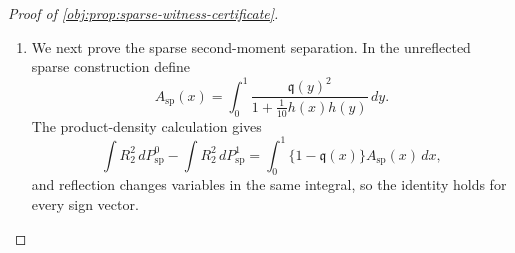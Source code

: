 \documentclass[11pt]{article}
\begin{document}
\begin{proof}[Proof of \cref{obj:prop:sparse-witness-certificate}]
\begin{enumerate}
For the cancellation law, put
\[
\bar\kappa=\int_0^1\kappa_1(x)\,dx,
\qquad
\overline{\kappa^2}=\int_0^1\kappa_1(x)^2\,dx.
\]
The function \(\kappa_1\) is continuous and nonconstant: indeed \(H(0)=H(1)=0\), while
\[
H(1/2)=\frac{\exp(2)-1}{\exp(4)-1}-\frac12
=\frac1{\exp(2)+1}-\frac12<0.
\]
Therefore
\[
0<\int_0^1\{\kappa_1(x)-\bar\kappa\}^2\,dx
=\overline{\kappa^2}-\bar\kappa^2.
\]
The cancellation child density is \(1+\frac1{10}\kappa_1(x)\chi_2(y)\), and the same centered-coordinate calculation gives
\[
\int \kappa_1(v_1)\,dP^0_{\mathrm{can}}(v)=\bar\kappa,
\qquad
\int \chi_2(v_2)\,dP^0_{\mathrm{can}}(v)=\frac1{30}\bar\kappa,
\]
\[
\int \kappa_1(v_1)\chi_2(v_2)\,dP^0_{\mathrm{can}}(v)=\frac1{30}\overline{\kappa^2}.
\]
Independence of the first two coordinates under \(P^0_{\mathrm{can}}\) would force
\[
\frac1{30}\overline{\kappa^2}
=
\bar\kappa\cdot\frac1{30}\bar\kappa,
\]
contradicting \(\overline{\kappa^2}-\bar\kappa^2>0\).  Hence the edge endpoints are also dependent in the cancellation observational law.  Finally, the factorization over \(1\to2\) with node \(3\) isolated gives the local-Markov independence of nodes \(1\) and \(3\).  In this three-node graph, any failed d-separation between disjoint coordinate blocks places the endpoints of the unique edge in opposite blocks; if the conditioning block contains node \(3\), contraction with the independence of nodes \(1\) and \(3\) reduces it to the unconditional edge independence just ruled out.  Both observational laws are therefore faithful to the three-node DAG, giving \cref{obj:ass:faithfulness}. %

\item We next prove the sparse second-moment separation.  In the unreflected sparse construction define
\[
A_{\mathrm{sp}}(x)
=
\int_0^1
\frac{\mathfrak q(y)^2}{1+\frac1{10}h(x)h(y)}\,dy .
\]
The product-density calculation gives
\[
\int R_2^2\,dP^0_{\mathrm{sp}}
-
\int R_2^2\,dP^1_{\mathrm{sp}}
=
\int_0^1 \{1-\mathfrak q(x)\}A_{\mathrm{sp}}(x)\,dx,
\]
and reflection changes variables in the same integral, so the identity holds for every sign vector.


\end{enumerate}
\end{proof}
\end{document}

